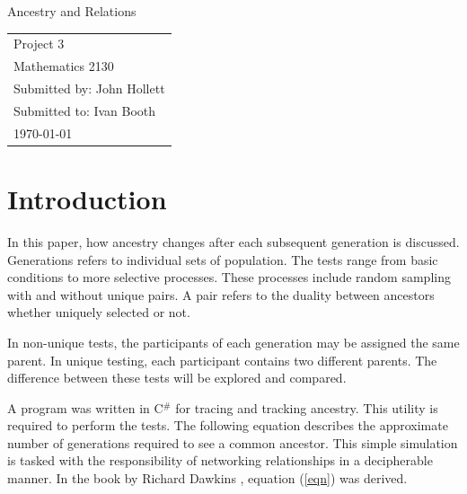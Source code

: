 \documentclass[12pt]{extarticle}
\begin{document}
\begin{titlepage}
\vspace*{2in}
\begin{center}
{\LARGE Ancestry and Relations}
\end{center}

\vspace{2cm}



\vspace{3in}
\begin{flushright}
\begin{tabular}{l}
Project 3 \\
Mathematics 2130\\
Submitted by: John Hollett\\
Submitted to: Ivan Booth\\
\today
\end{tabular}
\end{flushright}


\end{titlepage}


\rfoot{\thepage}




\section{Introduction}
In this paper, how ancestry changes after each subsequent generation is discussed. Generations refers to individual sets of population. The tests range from basic conditions to more selective processes. These processes include random sampling with and without unique pairs. A pair refers to the duality between ancestors whether uniquely selected or not. 

In non-unique tests, the participants of each generation may be assigned the same parent. In unique testing, each participant contains two different parents. The difference between these tests will be explored and compared.

A program was written in C$^\#$ for tracing and tracking ancestry. This utility is required to perform the tests. The following equation describes the approximate number of generations required to see a common ancestor. This simple simulation is tasked with the responsibility of networking relationships in a decipherable manner. 
In the book by Richard Dawkins \cite{Ancestor}, equation (\ref{eqn}) was derived.
\end{document}
